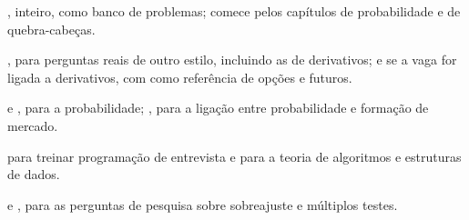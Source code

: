 \begin{leituras}
  \item \citet{zhou2008}, inteiro, como banco de problemas; comece pelos capítulos de probabilidade e de quebra-cabeças.
  \item \citet{crack2026}, para perguntas reais de outro estilo, incluindo as de derivativos; e \citet{joshi2013} se a vaga for ligada a derivativos, com \citet{hull2022} como referência de opções e futuros.
  \item \citet{mosteller1987} e \citet{blitzstein2019}, para a probabilidade; \citet{janestreetpm}, para a ligação entre probabilidade e formação de mercado.
  \item \citet{mcdowell2015} para treinar programação de entrevista e \citet{cormen2022} para a teoria de algoritmos e estruturas de dados.
  \item \citet{lopezdeprado2018} e \citet{harvey2016}, para as perguntas de pesquisa sobre sobreajuste e múltiplos testes.
\end{leituras}
